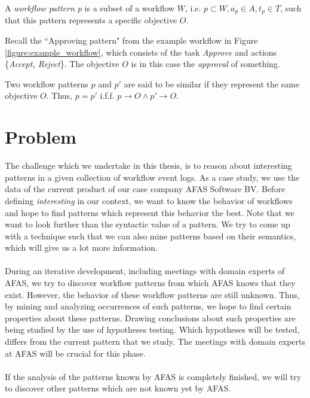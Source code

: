 \documentclass[a4paper,11pt]{article}
\begin{document}
\begin{defn}
A \textit{workflow pattern p} is a subset of a workflow $W$, i.e. $p \subset W, a_p \in A, t_p \in T$, such that this pattern represents a specific objective $O$.
\end{defn}
Recall the ``Approving pattern" from the example workflow in Figure \ref{figure:example_workflow}, which consists of the task \textit{Approve} and actions \{\textit{Accept, Reject}\}. The objective $O$ is in this case the \textit{approval} of something.

\begin{defn}
Two workflow patterns $p$ and $p'$ are said to be similar if they represent the same objective $O$. Thus, $p=p'$ i.f.f. $p \rightarrow O \wedge p' \rightarrow O$.
\end{defn}

\section{Problem}
The challenge which we undertake in this thesis, is to reason about interesting patterns in a given collection of workflow event logs. As a case study, we use the data of the current product of our case company AFAS Software BV. Before defining \textit{interesting} in our context, we want to know the behavior of workflows and hope to find patterns which represent this behavior the best. Note that we want to look further than the syntactic value of a pattern. We try to come up with a technique such that we can also mine patterns based on their semantics, which will give us a lot more information.\\
\\
During an iterative development, including meetings with domain experts of AFAS, we try to discover workflow patterns from which AFAS knows that they exist. However, the behavior of these workflow patterns are still unknown. Thus, by mining and analyzing occurrences of such patterns, we hope to find certain properties about these patterns. Drawing conclusions about such properties are being studied by the use of hypotheses testing. Which hypotheses will be tested, differs from the current pattern that we study. The meetings with domain experts at AFAS will be crucial for this phase.\\
\\
If the analysis of the patterns known by AFAS is completely finished, we will try to discover other patterns which are not known yet by AFAS.
\end{document}
